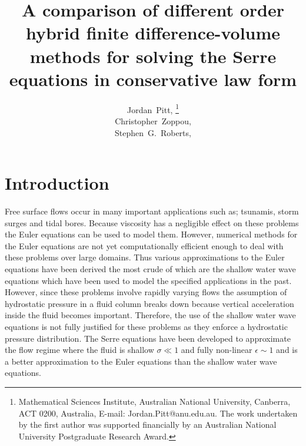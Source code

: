 \documentclass[SingleSpace,12pt]{Serre_ASCE}
\begin{document}
\title{A comparison of different order hybrid finite difference-volume methods for solving the Serre equations in conservative law form}

\author{
Jordan~Pitt,%
\thanks{Mathematical Sciences Institute, Australian National University, Canberra, ACT 0200, Australia, E-mail: Jordan.Pitt@anu.edu.au. The work undertaken by the first author was supported financially by an Australian National University Postgraduate Research Award.}
\\
Christopher~Zoppou,\footnotemark[1]%
%
\\
Stephen~G.~Roberts,\footnotemark[1]
}

\maketitle

\begin{abstract}

\end{abstract}


\linenumbers

\section{Introduction} \label{intro}
Free surface flows occur in many important applications such as; tsunamis, storm surges and tidal bores. Because viscosity has a negligible effect on these problems the Euler equations can be used to model them. However, numerical methods for the Euler equations are not yet computationally efficient enough to deal with these problems over large domains. Thus various approximations to the Euler equations have been derived the most crude of which are the shallow water wave equations which have been used to model the specified applications in the past. However, since these problems involve rapidly varying flows the assumption of hydrostatic pressure in a fluid column breaks down because vertical acceleration inside the fluid becomes important. Therefore, the use of the shallow water wave equations is not fully justified for these problems as they enforce a hydrostatic pressure distribution. The Serre equations have been developed to approximate the flow regime where the fluid is shallow $\sigma \ll 1$ and fully non-linear $\epsilon \sim 1$ \cite{Bonneton-Lannes-2009-16601} and is a better approximation to the Euler equations than the shallow water wave equations. 
\end{document}
